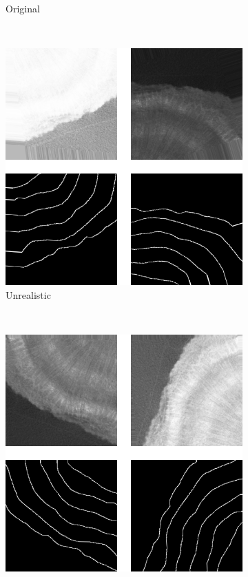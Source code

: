\begin{figure}[t]
\begin{subfigure}[t]{0.18\textwidth}
        \caption{Original}
    \end{subfigure}
    ~
    \begin{subfigure}[t]{0.38\textwidth}
        \centering
        \includegraphics[width=1\textwidth, valign=c]{images/bad-aug.png}
        \caption{Unrealistic}
    \end{subfigure}
    ~
    \begin{subfigure}[t]{0.38\textwidth}
        \centering
        \includegraphics[width=1\textwidth, valign=c]{images/good-aug.png}

\end{subfigure}
\end{figure}
